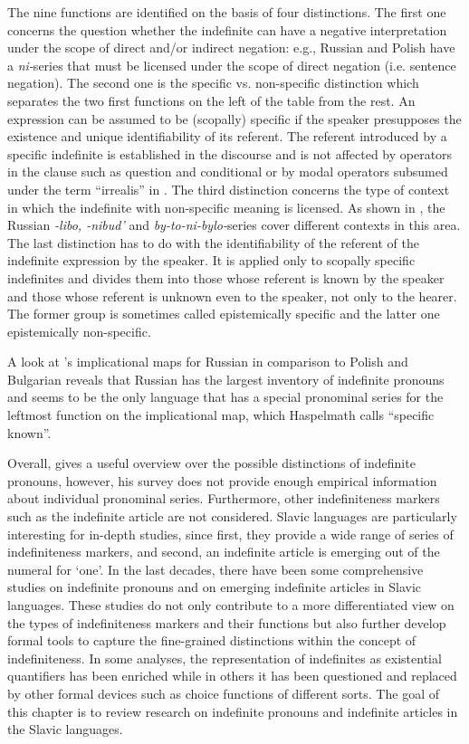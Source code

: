\documentclass[output=paper,colorlinks,citecolor=brown]{langscibook}
\begin{document}
The nine functions are identified on the basis of four distinctions. The first one concerns the question whether the indefinite can have a negative interpretation under the scope of direct and/or indirect negation: e.g., Russian and Polish have a \textit{ni-}series that must be licensed under the scope of direct negation (i.e. sentence negation). The second one is the specific vs. non-specific distinction which separates the two first functions on the left of the table from the rest. An expression can be assumed to be (scopally) specific if the speaker presupposes the existence and unique identifiability of its referent. The referent introduced by a specific indefinite is established in the discourse and is not affected by operators in the clause such as question and conditional or by modal operators subsumed under the term “irrealis” in . The third distinction concerns the type of context in which the indefinite with non-specific meaning is licensed. As shown in , the Russian \textit{-libo, -nibud’} and \textit{by-to-ni-bylo-}series cover different contexts in this area. The last distinction has to do with the identifiability of the referent of the indefinite expression by the speaker. It is applied only to scopally specific indefinites and divides them into those whose referent is known by the speaker and those whose referent is unknown even to the speaker, not only to the hearer. The former group is sometimes called epistemically specific and the latter one epistemically non-specific.

A look at \citeauthor{Haspelmath1997}’s implicational maps for Russian in comparison to Polish and Bulgarian reveals that Russian has the largest inventory of indefinite pronouns and seems to be the only language that has a special pronominal series for the leftmost function on the implicational map, which Haspelmath calls “specific known”.

Overall, \citet{Haspelmath1997} gives a useful overview over the possible distinctions of indefinite pronouns, however, his survey does not provide enough empirical information about individual pronominal series. Furthermore, other indefiniteness markers such as the indefinite article are not considered. Slavic languages are particularly interesting for in-depth studies, since first, they provide a wide range of series of indefiniteness markers, and second, an indefinite article is emerging out of the numeral for `one'. In the last decades, there have been some comprehensive studies on indefinite pronouns and on emerging indefinite articles in Slavic languages. These studies do not only contribute to a more differentiated view on the types of indefiniteness markers and their functions but also further develop formal tools to capture the fine-grained distinctions within the concept of indefiniteness. In some analyses, the representation of indefinites as existential quantifiers has been enriched while in others it has been questioned and replaced by other formal devices such as choice functions of different sorts. The goal of this chapter is to review research on indefinite pronouns and indefinite articles in the Slavic languages. 
\end{document}
